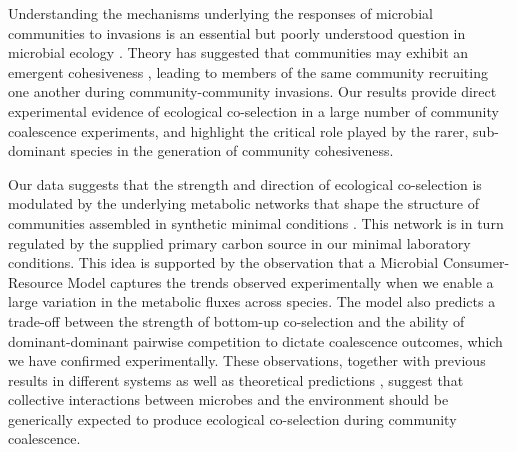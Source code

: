 \documentclass[a4paper,10pt]{article}
\begin{document}

Understanding the mechanisms underlying the responses of microbial communities to invasions is
an essential but poorly understood question in microbial ecology \cite{Rillig2015}.
Theory has suggested that communities may exhibit an emergent cohesiveness
\cite{Gilpin1994,Livingston2013,Tikhonov2016,Tikhonov2017},
leading to members of the same community recruiting one another during
community-community invasions.
Our results provide direct experimental evidence of ecological co-selection in a large number
of community coalescence experiments,
and highlight the critical role played by the rarer, sub-dominant species in the generation
of community cohesiveness.

Our data suggests that the strength and direction of ecological co-selection is modulated
by the underlying metabolic networks that shape the structure of
communities assembled in synthetic minimal conditions
\cite{Goldford2018,Estrela2020}.
This network is in turn regulated by the supplied primary carbon source
in our minimal laboratory conditions.
This idea is supported by the observation that a Microbial Consumer-Resource Model
captures the trends observed experimentally when we enable a large variation
in the metabolic fluxes across species.
The model also predicts a trade-off between the strength of bottom-up co-selection
and the ability of dominant-dominant pairwise competition to dictate coalescence outcomes,
which we have confirmed experimentally.
These observations,
together with previous results in different systems \cite{Sierocinski2017} as well as
theoretical predictions
\cite{Gilpin1994,Toquenaga1997,Tikhonov2016,Tikhonov2017,Vila2019,Lechon2021},
suggest that collective interactions between microbes
and the environment should be generically expected to produce ecological co-selection
during community coalescence.
\end{document}
